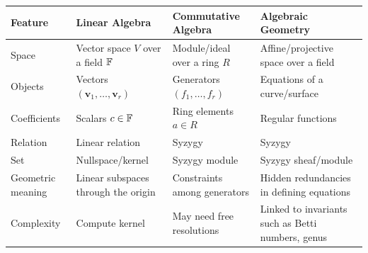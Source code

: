 \documentclass[11pt,openany]{article}
\begin{document}
\begin{table}[h!]
\centering
\small
\renewcommand{\arraystretch}{1.2}
\begin{tabular}{p{2.5cm}|p{3cm}|p{3.6cm}|p{6.5cm}}
	\toprule[1.2pt]
	\textbf{Feature} & \textbf{Linear Algebra} & \textbf{Commutative Algebra} & \textbf{Algebraic Geometry} \\
	\midrule
	Space & Vector space $V$ over a field $\mathbb{F}$ & Module/ideal over a ring $R$ & Affine/projective space over a field \\
	\hline
	Objects & Vectors $(\textbf{v}_1,\dots,\textbf{v}_r)$ & Generators $(f_1,\dots,f_r)$ & Equations of a curve/surface \\
	\hline
	Coefficients & Scalars $c\in \mathbb{F}$ & Ring elements $a\in R$ & Regular functions \\
	\hline
	Relation & Linear relation & Syzygy & Syzygy \\
	\hline
	Set & Nullspace/kernel & Syzygy module & Syzygy sheaf/module \\
	\hline
	Geometric meaning & Linear subspaces through the origin & Constraints among generators & Hidden redundancies in defining equations \\
	\hline
	Complexity & Compute kernel & May need free resolutions & Linked to invariants such as Betti numbers, genus \\
	\bottomrule[1.2pt]
\end{tabular}
\end{table}


\newpage
\end{document}
